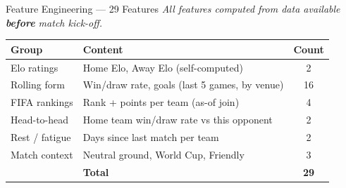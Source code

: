 \documentclass[10pt,aspectratio=169]{beamer}
\begin{document}
\begin{frame}{Feature Engineering --- 29 Features}
  \textit{All features computed from data available \textbf{before} match kick-off.}

  \medskip
  \begin{center}
    \begin{tabular}{llc}
      \toprule
      \textbf{Group} & \textbf{Content} & \textbf{Count} \\
      \midrule
      \rowcolor{LightBlue}
      Elo ratings & Home Elo, Away Elo (self-computed) & 2 \\
      Rolling form & Win/draw rate, goals (last 5 games, by venue) & 16 \\
      \rowcolor{LightBlue}
      FIFA rankings & Rank + points per team (as-of join) & 4 \\
      Head-to-head & Home team win/draw rate vs this opponent & 2 \\
      \rowcolor{LightBlue}
      Rest / fatigue & Days since last match per team & 2 \\
      Match context & Neutral ground, World Cup, Friendly & 3 \\
      \midrule
      & \textbf{Total} & \textbf{29} \\
      \bottomrule
    \end{tabular}
  \end{center}
\end{frame}
\end{document}
